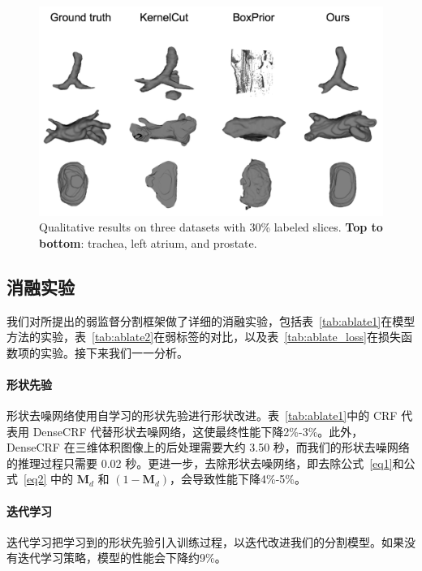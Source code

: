     \begin{figure}[tbp]
        \centering 
        \includegraphics[width=1.0\textwidth]{img/c3/final_vis3.png}
        {Qualitative results on three datasets with 30\% labeled slices. \textbf{Top to bottom}: trachea, left atrium, and prostate.}
        \label{fig:vis}
    \end{figure}


\subsection{消融实验} \label{sec:ablate}

我们对所提出的弱监督分割框架做了详细的消融实验，包括表~\ref{tab:ablate1}在模型方法的实验，表~\ref{tab:ablate2}在弱标签的对比，以及表~\ref{tab:ablate_loss}在损失函数项的实验。接下来我们一一分析。

\paragraph{形状先验}
形状去噪网络使用自学习的形状先验进行形状改进。表~\ref{tab:ablate1}中的 CRF 代表用 DenseCRF 代替形状去噪网络，这使最终性能下降2\%-3\%。此外，DenseCRF 在三维体积图像上的后处理需要大约 3.50 秒，而我们的形状去噪网络的推理过程只需要 0.02 秒。更进一步，去除形状去噪网络，即去除公式~\ref{eq1}和公式~\ref{eq2} 中的 $\mathbf{M}_d$ 和 $(1-\mathbf{M}_d)$，会导致性能下降4\%-5\%。
\paragraph{迭代学习}
迭代学习把学习到的形状先验引入训练过程，以迭代改进我们的分割模型。如果没有迭代学习策略，模型的性能会下降约9\%。
